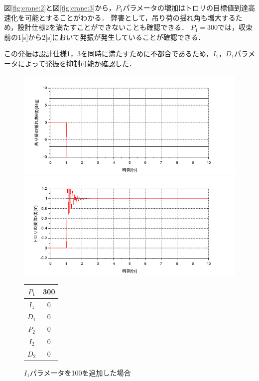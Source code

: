 \documentclass[dvipdfmx,titlepage,a4j]{jsarticle}  %
\begin{document}
図\ref{fig:crane:2}と図\ref{fig:crane:3}から，$P_1$パラメータの増加はトロリの目標値到達高速化を可能とすることがわかる．
弊害として，吊り荷の揺れ角も増大するため，設計仕様2を満たすことができないことも確認できる．
$P_1 = 300$では，収束前の1[s]から2[s]において発振が発生していることが確認できる．

この発振は設計仕様1，3を同時に満たすために不都合であるため，$I_1$，$D_1$パラメータによって発振を抑制可能か確認した．

\begin{figure}[H]
  \begin{minipage}{4.5cm}
    \centering
    \includegraphics[keepaspectratio, scale=0.35]{../graph/crane/ang-P1-300-I1-0-D1-0-P2-0-I2-0-D2-0.png}
  \end{minipage}
  \hfill
  \begin{minipage}{4.5cm}
    \centering
    \includegraphics[keepaspectratio, scale=0.35]{../graph/crane/po-P1-300-I1-0-D1-0-P2-0-I2-0-D2-0.png}
  \end{minipage}
  \hfill
  \begin{minipage}{3cm}
    \begin{center}
      \begin{tabular}{c|c}
        \hline
        $P_1$ & 300 \\ \hline
        $I_1$ & 0   \\ \hline
        $D_1$ & 0   \\ \hline
        $P_2$ & 0   \\ \hline
        $I_2$ & 0   \\ \hline
        $D_2$ & 0   \\
        \hline
      \end{tabular}
    \end{center}
  \end{minipage}
  \hfill
  \caption{$I_1$パラメータを100を追加した場合}
  \label{fig:crane:4}
\end{figure}
\end{document}
